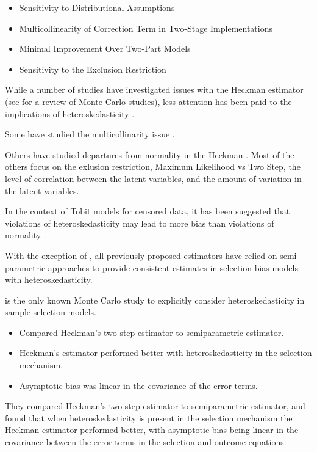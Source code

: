 \documentclass{article}
\begin{document}
\begin{itemize}
    \item Sensitivity to Distributional Assumptions
    \item Multicollinearity of Correction Term in Two-Stage Implementations
    \item Minimal Improvement Over Two-Part Models
    \item Sensitivity to the Exclusion Restriction
\end{itemize}

While a number of studies have investigated issues with the Heckman estimator (see \citet{puhani2000} for a review of Monte Carlo studies), less attention has been paid to the implications of heteroskedasticity \citep{vella1998}.  

Some have studied the multicollinarity issue \citep{leung1996, puhani1997}.  

Others have studied departures from normality in the Heckman \citep{paarsch1984}. Most of the others focus on the exlusion restriction, Maximum Likelihood vs Two Step, the level of correlation between the latent variables, and the amount of variation in the latent variables.  

In the context of Tobit models for censored data, it has been suggested that violations of heteroskedasticity may lead to more bias than violations of normality \citep{hurd1979}.  

With the exception of \citet{schaffner2002}, all previously proposed estimators \citep{donald1995, chen2003, ahn1993} have relied on semi-parametric approaches to provide consistent estimates in selection bias models with heteroskedasticity.  

\citet{fernandez1999} is the only known Monte Carlo study to explicitly consider heteroskedasticity in sample selection models. 
\begin{itemize}
    \item Compared Heckman's two-step estimator to \citet{ahn1993} semiparametric estimator.
    \item Heckman's estimator performed better with heteroskedasticity in the selection mechanism.
    \item Asymptotic bias was linear in the covariance of the error terms.
\end{itemize}

They compared Heckman's two-step estimator to \citet{ahn1993} semiparametric estimator, and found that when heteroskedasticity is present in the selection mechanism the Heckman estimator performed better, with asymptotic bias being linear in the covariance between the error terms in the selection and outcome equations. 
\end{document}
